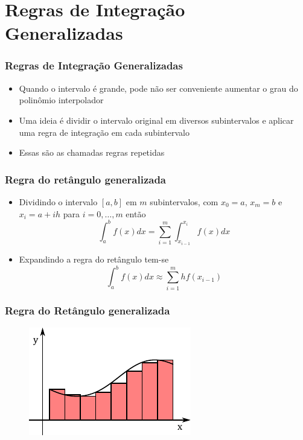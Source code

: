 \documentclass{beamer}
\theoremstyle{mystyle}
\begin{document}
\section{Regras de Integração Generalizadas}

\begin{frame}
	\frametitle{Regras de Integração Generalizadas}
	\begin{itemize}
		\item Quando o intervalo é grande, pode não ser conveniente	aumentar o grau do polinômio interpolador
		\item Uma ideia é dividir o intervalo original em diversos subintervalos e aplicar uma regra de integração em cada subintervalo
		\item Essas são as chamadas regras repetidas
	\end{itemize}
\end{frame}

\begin{frame}
	\frametitle{Regra do retângulo generalizada}
	\begin{itemize}
		\item Dividindo o intervalo $ [a,b] $ em $ m $ subintervalos, com $ x_{0} = a $, $ x_{m} = b $ e $ x_{i} = a + ih $ para $ i = 0,\ldots,m  $ então
		\begin{equation*}
			\int_{a}^{b}f(x)dx = \sum_{i=1}^{m}\int_{x_{i-1}}^{x_{i}}f(x)dx
		\end{equation*}
		\item Expandindo a regra do retângulo tem-se
		\begin{equation*}
			\int_{a}^{b}f(x)dx \approx \sum_{i=1}^{m}hf(x_{i-1})
		\end{equation*}
	\end{itemize}
\end{frame}

\begin{frame}
	\frametitle{Regra do Retângulo generalizada}
	\begin{figure}
		\centering
		\includegraphics[width=0.8\linewidth]{Figuras/grafico_06}
		\label{fig:grafico06}
	\end{figure}
\end{frame}
\end{document}
